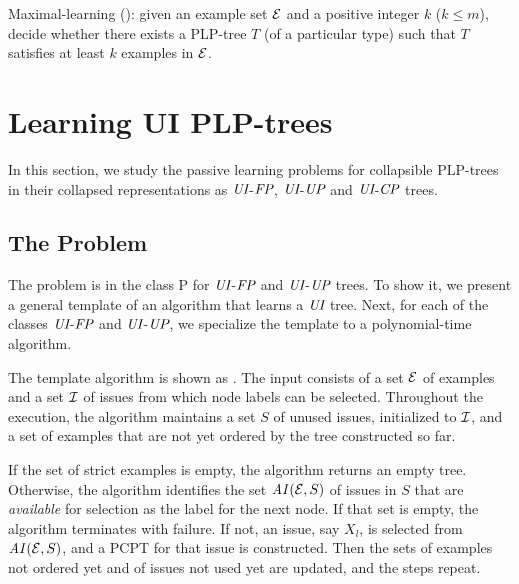 \begin{definition}
Maximal-learning (): given an example set $\mathcal{E}$ and a 
positive integer $k$ ($k \leq m$), decide whether there exists a PLP-tree 
$T$ (of a particular type) such that $T$ satisfies at least $k$ examples 
in $\mathcal{E}$.
\end{definition}


\section{Learning UI PLP-trees}
In this section, we study the passive learning problems for collapsible 
PLP-trees in their collapsed representations as $\textit{UI}$-$\textit{FP}$, $\textit{UI}$-$\textit{UP}$ and
$\textit{UI}$-$\textit{CP}$ trees.


\vspace{-0.1cm}
\subsection{The  Problem}
\vspace{-0.1cm}

The  problem is in the class P for $\textit{UI}$-$\textit{FP}$ and
$\textit{UI}$-$\textit{UP}$ trees. To show it, we present a general 
template of an algorithm that learns a $\textit{UI}$ tree. Next, for each of the classes
$\textit{UI}$-$\textit{FP}$ and $\textit{UI}$-$\textit{UP}$, we specialize the template to a 
polynomial-time algorithm.

The template algorithm is shown as . The 
input consists of a set $\mathcal{E}$ of examples and a set $\mathcal{I}$ of issues 
from which node labels can be selected. Throughout the execution, the 
algorithm maintains a set $S$ of unused issues, initialized to $\mathcal{I}$, 
and a set of examples that are not yet ordered by the tree constructed 
so far.

If the set of strict examples is empty, the algorithm returns an empty tree. 
Otherwise, the algorithm identifies the set $\mathit{AI}(\mathcal{E},S)$ of issues in 
$S$ that are \emph{available} for selection as the label for the next 
node. If that set is empty, the algorithm terminates with failure. If
not, an issue, say $X_l$, is selected from $\mathit{AI}(\mathcal{E},S)$, and a PCPT for
that issue is constructed. Then the sets of examples not ordered yet 
and of issues not used yet are updated, and the steps repeat.  


